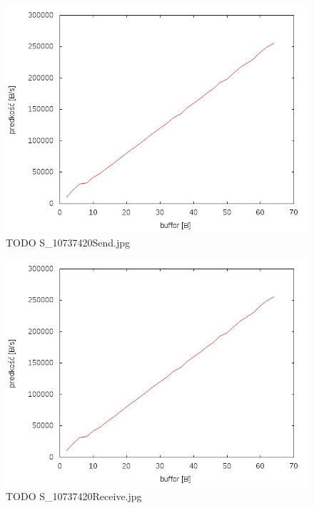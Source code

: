 \documentclass{BscUS}
\begin{document}
\begin{figure}[h]
\centering
\includegraphics{./img/S_10737420Send}
\caption{TODO S\_10737420Send.jpg}
\end{figure}

\begin{figure}[h]
\centering
\includegraphics{./img/S_10737420Receive}
\caption{TODO S\_10737420Receive.jpg}
\end{figure}
\end{document}

